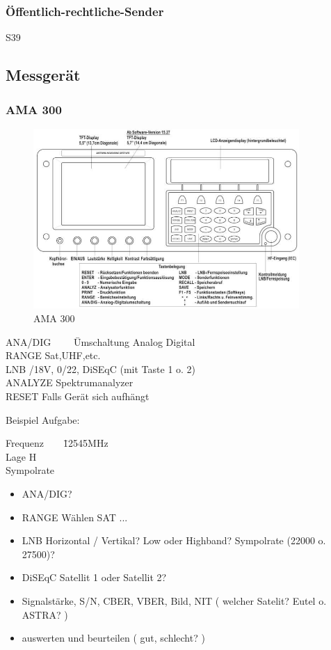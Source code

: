 \documentclass[12pt,a4paper]{article}
\begin{document}
\subsubsection{Öffentlich-rechtliche-Sender}
S39

\pagebreak
\subsection{Messgerät}
\subsubsection{AMA 300}

\begin{figure}[h]
 \centering
 \includegraphics[width=0.9\textwidth]{"bild1.jpg"}
 \caption{AMA 300}
 \label{fig:ama300}
\end{figure}

\begin{tabbing}
ANA/DIG~~~~ \= Umschaltung Analog Digital\\
RANGE \> Sat,UHF,etc.\\
LNB /18V, 0/22, DiSEqC (mit Taste 1 o. 2)\\
ANALYZE \> Spektrumanalyzer\\
RESET \> Falls Gerät sich aufhängt
\end{tabbing}
Beispiel Aufgabe:
\begin{tabbing}
Frequenz~~~~\= 12545MHz\\
Lage \> H\\
Sympolrate 
\end{tabbing}

\begin{itemize}
\item ANA/DIG?
\item RANGE Wählen SAT ...
\item LNB Horizontal / Vertikal? Low oder Highband? Sympolrate (22000 o. 27500)?
\item DiSEqC Satellit 1 oder Satellit 2?
\item Signalstärke, S/N, CBER, VBER, Bild, NIT ( welcher Satelit? Eutel o. ASTRA? )
\item auswerten und beurteilen ( gut, schlecht? )
\end{itemize}
\end{document}
